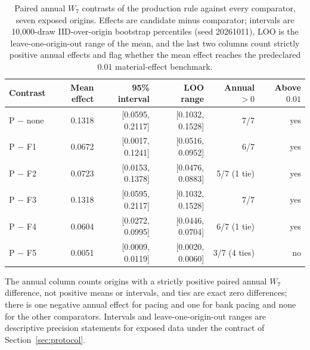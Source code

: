 \begin{table}[!tbp]
\centering
\caption{Paired annual $W_7$ contrasts of the production rule against every comparator, seven exposed origins. Effects are candidate minus comparator; intervals are 10{,}000-draw IID-over-origin bootstrap percentiles (seed 20261011), LOO is the leave-one-origin-out range of the mean, and the last two columns count strictly positive annual effects and flag whether the mean effect reaches the predeclared $0.01$ material-effect benchmark.}
\label{tab:r2-contrasts}
\scriptsize
\setlength{\tabcolsep}{3pt}
\begin{tabular}{@{}lrrrrr@{}}
\toprule
Contrast & Mean effect & 95\% interval & LOO range & Annual $>0$ & Above $0.01$ \\
\midrule
P $-$ none & 0.1318 & [0.0595, 0.2117] & [0.1032, 0.1528] & 7/7 & yes \\
P $-$ F1 & 0.0672 & [0.0017, 0.1241] & [0.0516, 0.0952] & 6/7 & yes \\
P $-$ F2 & 0.0723 & [0.0153, 0.1378] & [0.0476, 0.0883] & 5/7 (1 tie) & yes \\
P $-$ F3 & 0.1318 & [0.0595, 0.2117] & [0.1032, 0.1528] & 7/7 & yes \\
P $-$ F4 & 0.0604 & [0.0272, 0.0995] & [0.0446, 0.0704] & 6/7 (1 tie) & yes \\
P $-$ F5 & 0.0051 & [0.0009, 0.0119] & [0.0020, 0.0060] & 3/7 (4 ties) & no \\
\bottomrule
\end{tabular}
\par\footnotesize The annual column counts origins with a strictly positive paired annual $W_7$ difference, not positive means or intervals, and ties are exact zero differences; there is one negative annual effect for pacing and one for bank pacing and none for the other comparators. Intervals and leave-one-origin-out ranges are descriptive precision statements for exposed data under the contract of Section~\ref{sec:protocol}.
\end{table}
